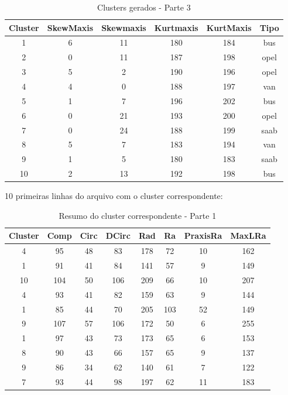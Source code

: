 \begin{table}[H]
\centering
\caption{Clusters gerados - Parte 3}
\begin{tabular}{|c|c|c|c|c|c|}
\hline
Cluster & SkewMaxis & Skewmaxis & Kurtmaxis & KurtMaxis & Tipo \\ \hline
1  & 6  & 11 & 180 & 184 & bus  \\ \hline
2  & 0  & 11 & 187 & 198 & opel \\ \hline
3  & 5  & 2  & 190 & 196 & opel \\ \hline
4  & 4  & 0  & 188 & 197 & van  \\ \hline
5  & 1  & 7  & 196 & 202 & bus  \\ \hline
6  & 0  & 21 & 193 & 200 & opel \\ \hline
7  & 0  & 24 & 188 & 199 & saab \\ \hline
8  & 5  & 7  & 183 & 194 & van  \\ \hline
9  & 1  & 5  & 180 & 183 & saab \\ \hline
10 & 2  & 13 & 192 & 198 & bus  \\ \hline
\end{tabular}
\end{table}

10 primeiras linhas do arquivo com o cluster correspondente:

\begin{table}[H]
\centering
\caption{Resumo do cluster correspondente - Parte 1}
\begin{tabular}{|c|c|c|c|c|c|c|c|}
\hline
Cluster & Comp & Circ & DCirc & Rad & Ra & PraxisRa & MaxLRa \\ \hline
4  & 95  & 48  & 83  & 178 & 72  & 10 & 162 \\ \hline
1  & 91  & 41  & 84  & 141 & 57  & 9  & 149 \\ \hline
10 & 104 & 50  & 106 & 209 & 66  & 10 & 207 \\ \hline
4  & 93  & 41  & 82  & 159 & 63  & 9  & 144 \\ \hline
1  & 85  & 44  & 70  & 205 & 103 & 52 & 149 \\ \hline
9  & 107 & 57  & 106 & 172 & 50  & 6  & 255 \\ \hline
1  & 97  & 43  & 73  & 173 & 65  & 6  & 153 \\ \hline
8  & 90  & 43  & 66  & 157 & 65  & 9  & 137 \\ \hline
9  & 86  & 34  & 62  & 140 & 61  & 7  & 122 \\ \hline
7  & 93  & 44  & 98  & 197 & 62  & 11 & 183 \\ \hline
\end{tabular}
\end{table}

